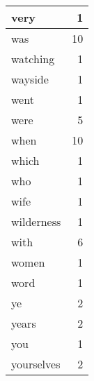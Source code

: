 \begin{center}
\begin{longtable}{l|r}
very & 1 \\ \hline
was & 10 \\ \hline
watching & 1 \\ \hline
wayside & 1 \\ \hline
went & 1 \\ \hline
were & 5 \\ \hline
when & 10 \\ \hline
which & 1 \\ \hline
who & 1 \\ \hline
wife & 1 \\ \hline
wilderness & 1 \\ \hline
with & 6 \\ \hline
women & 1 \\ \hline
word & 1 \\ \hline
ye & 2 \\ \hline
years & 2 \\ \hline
you & 1 \\ \hline
yourselves & 2 \\ \hline
\end{longtable}
\end{center}



\normalsize



